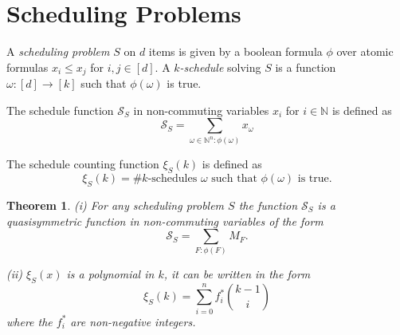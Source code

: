 \documentclass[12pt,reqno]{amsart}
\numberwithin{definition}{section}
\newtheorem{theorem}[definition]{Theorem}
\newcommand{\NN}{\mathbb{N}}
\newcommand{\SSS}{\mathcal{S}}
\newcommand{\defn}[1]{\emph{#1}}
\begin{document}
\section{Scheduling Problems}







A \defn{scheduling problem} $S$ on $d$ items is given by a boolean
formula $\phi$ over atomic formulas $x_i\leq x_j$ for
$i,j\in[d]$.  A \defn{$k$-schedule} solving $S$ is a function
$\omega:[d]\rightarrow[k]$ such that $\phi(\omega)$ is true.


The schedule function $\SSS_S$ in non-commuting variables
$x_i$ for $i\in \NN$ is defined as
\[
  \SSS_S = \sum_{\omega\in \NN^n: \phi(\omega) } x_\omega
\] 

The schedule counting function $\xi_S(k)$ is defined as
\[
  \xi_S(k) = \# \text{$k$-schedules $\omega$ such that $\phi(\omega)$ is true}.
\]



\begin{theorem}

(i) For any scheduling problem $S$ the function $\SSS_S$ is a quasisymmetric function in non-commuting variables of the form
\[
  \SSS_S = \sum_{F: \phi(F)} M_F.
\]

(ii) $\xi_S(x)$ is a polynomial in $k$, it can be written in the form 
\[
  \xi_S(k) = \sum_{i=0}^n f_i^* \binom{k-1}{i}
\]
where the $f_i^*$ are non-negative integers. 

\end{theorem}
\end{document}
